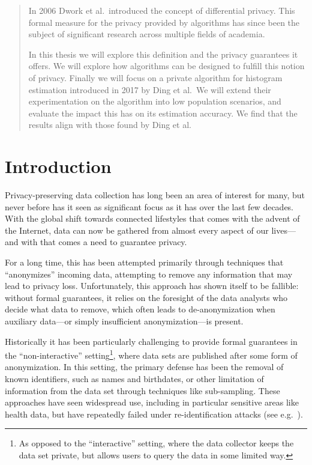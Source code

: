 \documentclass[a4paper,12pt]{article}
\begin{document}


\renewcommand{\abstractname}{Abstract}
\begin{abstract}
In 2006 Dwork et al.\ introduced the concept of differential privacy. This formal measure for the privacy provided by algorithms has since been the subject of significant research across multiple fields of academia.

In this thesis we will explore this definition and the privacy guarantees it offers. We will explore how algorithms can be designed to fulfill this notion of privacy. Finally we will focus on a private algorithm for histogram estimation introduced in 2017 by Ding et al.\ We will extend their experimentation on the algorithm into low population scenarios, and evaluate the impact this has on its estimation accuracy. We find that the results align with those found by Ding et al.
\end{abstract}

\thispagestyle{empty}
\newpage
\thispagestyle{empty}
\tableofcontents
\newpage
{}

\section{Introduction}

Privacy-preserving data collection has long been an area of interest for many, but never before has it seen as significant focus as it has over the last few decades. With the global shift towards connected lifestyles that comes with the advent of the Internet, data can now be gathered from almost every aspect of our lives---and with that comes a need to guarantee privacy.

For a long time, this has been attempted primarily through techniques that ``anonymizes'' incoming data, attempting to remove any information that may lead to privacy loss. Unfortunately, this approach has shown itself to be fallible: without formal guarantees, it relies on the foresight of the data analysts who decide what data to remove, which often leads to de-anonymization when auxiliary data---or simply insufficient anonymization---is present.

Historically it has been particularly challenging to provide formal guarantees in the ``non-interactive'' setting\footnote{As opposed to the ``interactive'' setting, where the data collector keeps the data set private, but allows users to query the data in some limited way.}, where data sets are published after some form of anonymization. In this setting, the primary defense has been the removal of known identifiers, such as names and birthdates, or other limitation of information from the data set through techniques like sub-sampling. These approaches have seen widespread use, including in particular sensitive areas like health data, but have repeatedly failed under re-identification attacks (see e.g.\ \cite{reidentification2011}).
\end{document}

